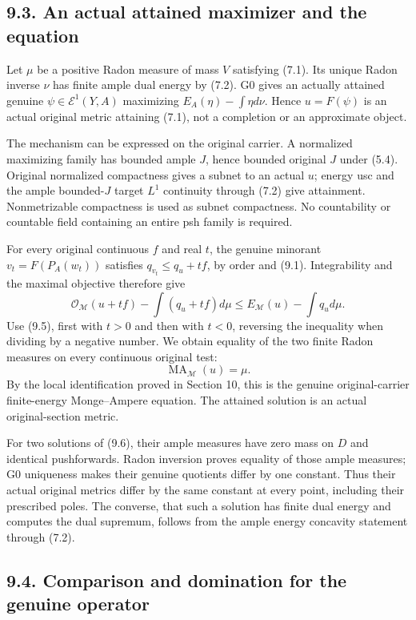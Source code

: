 \documentclass[
  10pt,
]{article}
\begin{document}
\subsection{9.3. An actual attained maximizer and the
equation}\label{an-actual-attained-maximizer-and-the-equation}

Let \(\mu\) be a positive Radon measure of mass \(V\) satisfying (7.1).
Its unique Radon inverse \(\nu\) has finite ample dual energy by (7.2).
G0 gives an actually attained genuine \(\psi\in\mathcal E^1(Y,A)\)
maximizing \(E_A(\eta)-\int\eta d\nu\). Hence \(u=F(\psi)\) is an actual
original metric attaining (7.1), not a completion or an approximate
object.

The mechanism can be expressed on the original carrier. A normalized
maximizing family has bounded ample \(J\), hence bounded original \(J\)
under (5.4). Original normalized compactness gives a subnet to an actual
\(u\); energy usc and the ample bounded-\(J\) target \(L^1\) continuity
through (7.2) give attainment. Nonmetrizable compactness is used as
subnet compactness. No countability or countable field containing an
entire psh family is required.

For every original continuous \(f\) and real \(t\), the genuine minorant
\(v_t=F(P_A(w_t))\) satisfies \(q_{v_t}\leq q_u+tf\), by order and
(9.1). Integrability and the maximal objective therefore give
\[\mathscr O_{\mathcal M}(u+tf)-\int(q_u+tf)d\mu
\leq E_{\mathcal M}(u)-\int q_ud\mu.\] Use (9.5), first with \(t>0\) and
then with \(t<0\), reversing the inequality when dividing by a negative
number. We obtain equality of the two finite Radon measures on every
continuous original test:
\[\operatorname{MA}_{\mathcal M}(u)=\mu.                       \tag{9.6}\]
By the local identification proved in Section 10, this is the genuine
original-carrier finite-energy Monge--Ampere equation. The attained
solution is an actual original-section metric.

For two solutions of (9.6), their ample measures have zero mass on \(D\)
and identical pushforwards. Radon inversion proves equality of those
ample measures; G0 uniqueness makes their genuine quotients differ by
one constant. Thus their actual original metrics differ by the same
constant at every point, including their prescribed poles. The converse,
that such a solution has finite dual energy and computes the dual
supremum, follows from the ample energy concavity statement through
(7.2).

\subsection{9.4. Comparison and domination for the genuine
operator}\label{comparison-and-domination-for-the-genuine-operator}
\end{document}
